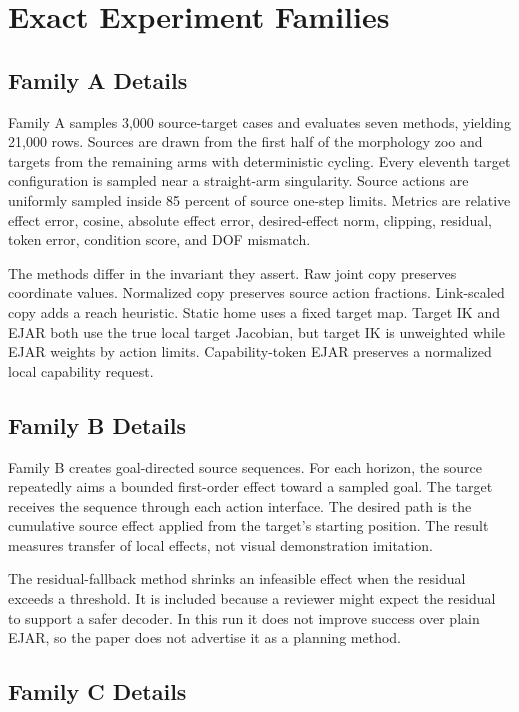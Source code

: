 \documentclass{article}
\begin{document}


\section{Exact Experiment Families}

\subsection{Family A Details}

Family A samples 3,000 source-target cases and evaluates seven methods, yielding 21,000 rows. Sources are drawn from the first half of the morphology zoo and targets from the remaining arms with deterministic cycling. Every eleventh target configuration is sampled near a straight-arm singularity. Source actions are uniformly sampled inside 85 percent of source one-step limits. Metrics are relative effect error, cosine, absolute effect error, desired-effect norm, clipping, residual, token error, condition score, and DOF mismatch.

The methods differ in the invariant they assert. Raw joint copy preserves coordinate values. Normalized copy preserves source action fractions. Link-scaled copy adds a reach heuristic. Static home uses a fixed target map. Target IK and EJAR both use the true local target Jacobian, but target IK is unweighted while EJAR weights by action limits. Capability-token EJAR preserves a normalized local capability request.

\subsection{Family B Details}

Family B creates goal-directed source sequences. For each horizon, the source repeatedly aims a bounded first-order effect toward a sampled goal. The target receives the sequence through each action interface. The desired path is the cumulative source effect applied from the target's starting position. The result measures transfer of local effects, not visual demonstration imitation.

The residual-fallback method shrinks an infeasible effect when the residual exceeds a threshold. It is included because a reviewer might expect the residual to support a safer decoder. In this run it does not improve success over plain EJAR, so the paper does not advertise it as a planning method.

\subsection{Family C Details}
\end{document}
